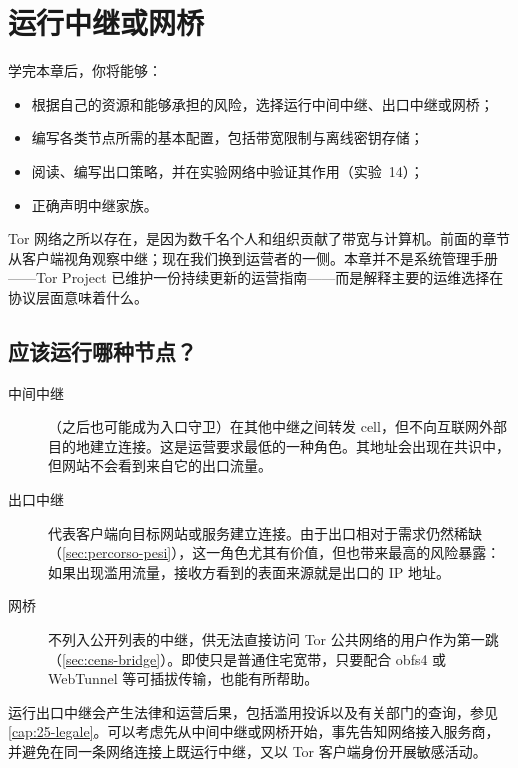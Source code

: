 \chapter{运行中继或网桥}\label{cap:22-relay}

\begin{obiettivi}
学完本章后，你将能够：
\begin{itemize}[nosep]
  \item 根据自己的资源和能够承担的风险，选择运行中间中继、出口中继或网桥；
  \item 编写各类节点所需的基本配置，包括带宽限制与离线密钥存储；
  \item 阅读、编写出口策略，并在实验网络中验证其作用（实验~14）；
  \item 正确声明中继家族。
\end{itemize}
\end{obiettivi}

Tor 网络之所以存在，是因为数千名个人和组织贡献了带宽与计算机。前面的章节从客户端视角观察中继；现在我们换到运营者的一侧。本章并不是系统管理手册——Tor Project 已维护一份持续更新的运营指南——而是解释主要的运维选择在协议层面意味着什么。

\section{应该运行哪种节点？}\label{sec:relay-tipi}

\begin{description}
  \item[中间中继]（之后也可能成为入口守卫）在其他中继之间转发 cell，但不向互联网外部目的地建立连接。这是运营要求最低的一种角色。其地址会出现在共识中，但网站不会看到来自它的出口流量。
  \item[出口中继] 代表客户端向目标网站或服务建立连接。由于出口相对于需求仍然稀缺（\cref{sec:percorso-pesi}），这一角色尤其有价值，但也带来最高的风险暴露：如果出现滥用流量，接收方看到的表面来源就是出口的 IP 地址。
  \item[网桥] 不列入公开列表的中继，供无法直接访问 Tor 公共网络的用户作为第一跳（\cref{sec:cens-bridge}）。即使只是普通住宅宽带，只要配合 obfs4 或 WebTunnel 等可插拔传输，也能有所帮助。
\end{description}

\begin{attenzione}[开始之前]
运行出口中继会产生法律和运营后果，包括滥用投诉以及有关部门的查询，参见 \cref{cap:25-legale}。可以考虑先从中间中继或网桥开始，事先告知网络接入服务商，并避免在同一条网络连接上既运行中继，又以 Tor 客户端身份开展敏感活动。
\end{attenzione}

